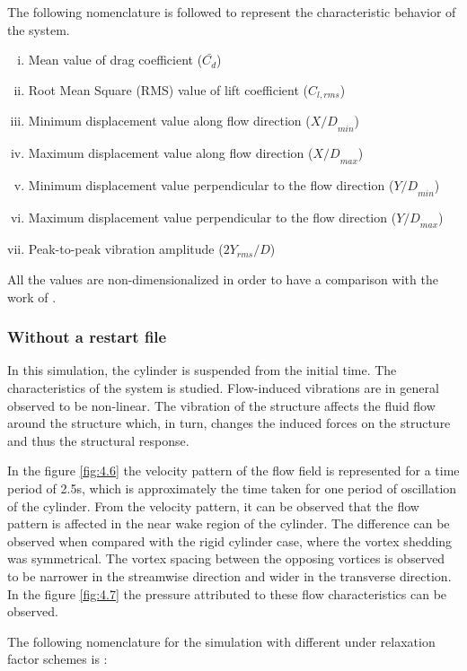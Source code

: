 The following nomenclature is followed to represent the characteristic behavior of the system.

\begin{enumerate}[(i)]
\item Mean value of drag coefficient ($\bar{C_d}$)
\item Root Mean Square (RMS) value of lift coefficient ($C_{l,rms}$)
\item Minimum displacement value along flow direction (${X/D}_{min}$)
\item Maximum displacement value along flow direction (${X/D}_{max}$)
\item Minimum displacement value perpendicular to the flow direction (${Y/D}_{min}$)
\item Maximum displacement value perpendicular to the flow direction (${Y/D}_{max}$)
\item Peak-to-peak vibration amplitude ($2 {Y_{rms}}/D$)
\end{enumerate}

All the values are non-dimensionalized in order to have a comparison with the work of \citet{zhou1999vortex}. 

\subsubsection{Without a restart file}
In this simulation, the cylinder is suspended from the initial time. The characteristics of the system is studied. Flow-induced vibrations are in general observed to be non-linear. The vibration of the structure affects the fluid flow around the structure which, in turn, changes the induced forces on the structure and thus the structural response. 

In the figure \ref{fig:4.6} the velocity pattern of the flow field is represented for a time period of 2.5s, which is approximately the time taken for one period of oscillation of the cylinder. From the velocity pattern, it can be observed that the flow pattern is affected in the near wake region of the cylinder. The difference can be observed when compared with the rigid cylinder case, where the vortex shedding was symmetrical. The vortex spacing between the opposing vortices is observed to be narrower in the streamwise direction and wider in the transverse direction. In the figure \ref{fig:4.7} the pressure attributed to these flow characteristics can be observed.

The following nomenclature for the simulation with different under relaxation factor schemes is :

